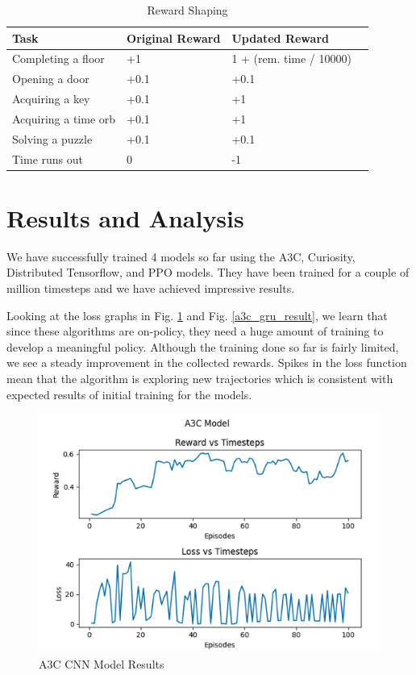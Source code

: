 \documentclass[conference]{IEEEtran}
\begin{document}
\begin{table}[h!]
    \centering
    \begin{tabular}{ |l|l|l|l| } 
        \hline
        Task & Original Reward & Updated Reward \\
        \hline
        Completing a floor   & +1   & 1 + (rem. time / 10000) \\ 
        Opening a door       & +0.1 & +0.1 \\ 
        Acquiring a key      & +0.1 & +1 \\ 
        Acquiring a time orb & +0.1 & +1 \\ 
        Solving a puzzle     & +0.1 & +0.1 \\ 
        Time runs out        & 0    & -1 \\ 
    \hline
    \end{tabular}
    \vspace{1ex}
    \caption{Reward Shaping}
    \label{reward_table}
\end{table}

\section{Results and Analysis}

We have successfully trained 4 models so far using the A3C, Curiosity, Distributed Tensorflow, and PPO models. They have been trained for a couple of million timesteps and we have achieved impressive results.

Looking at the loss graphs in Fig. \ref{a3c_cnn_result} and Fig. \ref{a3c_gru_result}, we learn that since these algorithms are on-policy, they need a huge amount of training to develop a meaningful policy. Although the training done so far is fairly limited, we see a steady improvement in the collected rewards. Spikes in the loss function mean that the algorithm is exploring new trajectories which is consistent with expected results of initial training for the models.

\begin{figure}[h!]
    \centering
    \includegraphics[width=\linewidth]{a3c_cnn_result.png}
    \caption{A3C CNN Model Results}
    \label{a3c_cnn_result}
\end{figure}
\end{document}
